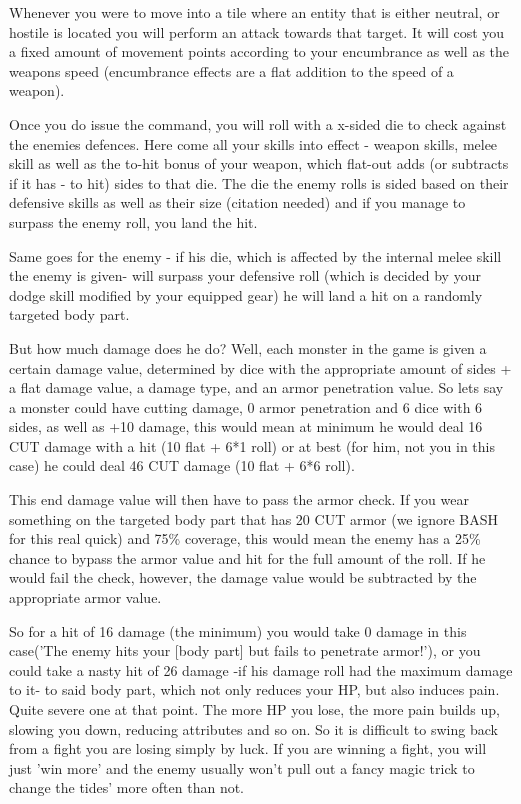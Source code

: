 Whenever you were to move into a tile where an entity that is either neutral, or hostile is located you will perform an attack towards that target. It will cost you a fixed amount of movement points according to your encumbrance as well as the weapons speed (encumbrance effects are a flat addition to the speed of a weapon).

Once you do issue the command, you will roll with a x-sided die to check against the enemies defences. Here come all your skills into effect - weapon skills, melee skill as well as the to-hit bonus of your weapon, which flat-out adds (or subtracts if it has - to hit) sides to that die. The die the enemy rolls is sided based on their defensive skills as well as their size (citation needed) and if you manage to surpass the enemy roll, you land the hit.

Same goes for the enemy - if his die, which is affected by the internal melee skill the enemy is given- will surpass your defensive roll (which is decided by your dodge skill modified by your equipped gear) he will land a hit on a randomly targeted body part.

But how much damage does he do? Well, each monster in the game is given a certain damage value, determined by dice with the appropriate amount of sides + a flat damage value, a damage type, and an armor penetration value. So lets say a monster could have cutting damage, 0 armor penetration and 6 dice with 6 sides, as well as +10 damage, this would mean at minimum he would deal 16 CUT damage with a hit (10 flat + 6*1 roll) or at best (for him, not you in this case) he could deal 46 CUT damage (10 flat + 6*6 roll).

This end damage value will then have to pass the armor check. If you wear something on the targeted body part that has 20 CUT armor (we ignore BASH for this real quick) and 75\% coverage, this would mean the enemy has a 25\% chance to bypass the armor value and hit for the full amount of the roll. If he would fail the check, however, the damage value would be subtracted by the appropriate armor value.

So for a hit of 16 damage (the minimum) you would take 0 damage in this case('The enemy hits your [body part] but fails to penetrate armor!'), or you could take a nasty hit of 26 damage -if his damage roll had the maximum damage to it- to said body part, which not only reduces your HP, but also induces pain. Quite severe one at that point. The more HP you lose, the more pain builds up, slowing you down, reducing attributes and so on. So it is difficult to swing back from a fight you are losing simply by luck. If you are winning a fight, you will just 'win more' and the enemy usually won't pull out a fancy magic trick to change the tides' more often than not.

